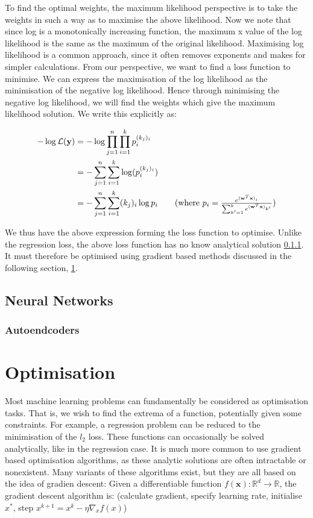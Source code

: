 To find the optimal weights, the maximum likelihood perspective is to take the weights in such a way as to maximise the above likelihood. Now we note that since log is a monotonically increasing function, the maximum x value of the log likelihood is the same as the maximum of the original likelihood. Maximising log likelihood is a common approach, since it often removes exponents and makes for simpler calculations. From our perspective, we want to find a loss function to minimise. We can express the maximisation of the log likelihood as the minimisation of the negative log likelihood. Hence through minimising the negative log likelihood, we will find the weights which give the maximum likelihood solution. We write this explicitly as:

\begin{align}
-\log\mathcal{L}(\mathbf{y}) &= -\log \prod_{j=1}^{n}\prod_{i=1}^{k}p_i^{(k_j)_i} \\ 
&= -\sum_{j=1}^{n}\sum_{i=1}^{k}\log (p_i^{(k_j)_i})\\
&= -\sum_{j=1}^{n}\sum_{i=1}^{k}(k_j)_i\log p_i \tag{where $p_i = \frac{e^{(\mathbf{w}^T\mathbf{x})_i}}{\sum_{k'=1}^{k} e^{(\mathbf{w}^T\mathbf{x})_{k'}}}$}
\end{align}

We thus have the above expression forming the loss function to optimise. Unlike the regression loss, the above loss function has no know analytical solution \ref{}. It must therefore be optimised using gradient based methods discussed in the following section, \ref{optimisation}.

\subsection{Neural Networks}
\subsubsection{Autoendcoders}



\section{Optimisation}
\label{optimisation}
Most machine learning problems can fundamentally be considered as optimisation tasks. That is, we wish to find the extrema of a function, potentially given some constraints. For example, a regression problem can be reduced to the minimisation of the $l_2$ loss. These functions can occasionally be solved analytically, like in the regression case. It is much more common to use gradient based optimisation algorithms, as these analytic solutions are often intractable or nonexistent. Many variants of these algorithms exist, but they are all based on the idea of gradien descent: Given a differentiable function $f(\mathbf{x}) : \mathbb{R}^d \to \mathbb{R}$, the gradient descent algorithm is: (calculate gradient, specify learning rate, initialise $x^*$, step $x^{k+1} = x ^ k - \eta \nabla_x f(x)$) \\



